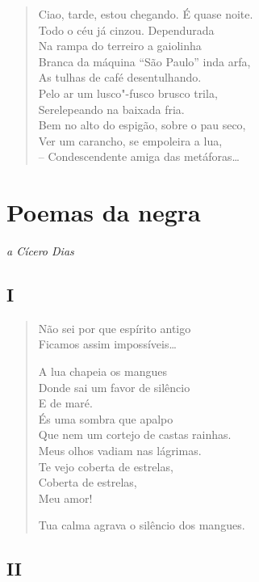 {\begin{verse}
Ciao, tarde, estou chegando. É quase noite.\\
Todo o céu já cinzou. Dependurada\\
Na rampa do terreiro a gaiolinha\\
Branca da máquina ``São Paulo'' inda arfa,\\
As tulhas de café desentulhando.\\
Pelo ar um lusco"-fusco brusco trila,\\
Serelepeando na baixada fria.\\
Bem no alto do espigão, sobre o pau seco,\\
Ver um carancho, se empoleira a lua,\\
-- Condescendente amiga das metáforas\ldots{}
\end{verse}

\chapter[Poemas da negra]{Poemas da negra }

\begin{flushright}
\emph{a Cícero Dias}
\end{flushright}

\section*{I}

\begin{verse}
Não sei por que espírito antigo\\
Ficamos assim impossíveis\ldots{}

A lua chapeia os mangues\\
Donde sai um favor de silêncio\\
E de maré.\\
És uma sombra que apalpo\\
Que nem um cortejo de castas rainhas.\\
Meus olhos vadiam nas lágrimas.\\
Te vejo coberta de estrelas,\\
Coberta de estrelas,\\
Meu amor!

Tua calma agrava o silêncio dos mangues.
\end{verse}

\pagebreak
\section*{II}

}
